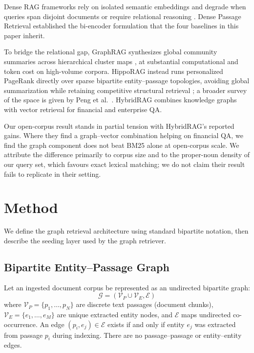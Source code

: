 \documentclass[runningheads]{llncs}
\begin{document}
Dense RAG frameworks rely on isolated semantic embeddings and degrade when queries span disjoint documents or require relational reasoning \cite{lewis2020rag}. Dense Passage Retrieval \cite{karpukhin2020dpr} established the bi-encoder formulation that the four baselines in this paper inherit.

To bridge the relational gap, GraphRAG synthesizes global community summaries across hierarchical cluster maps \cite{edge2024graphrag}, at substantial computational and token cost on high-volume corpora. HippoRAG instead runs personalized PageRank directly over sparse bipartite entity--passage topologies, avoiding global summarization while retaining competitive structural retrieval \cite{gutierrez2025hipporag2}; a broader survey of the space is given by Peng et al.~\cite{peng2024graphrag}. HybridRAG \cite{sarmah2024hybridrag} combines knowledge graphs with vector retrieval for financial and enterprise QA.

Our open-corpus result stands in partial tension with HybridRAG's reported gains. Where they find a graph--vector combination helping on financial QA, we find the graph component does not beat BM25 alone at open-corpus scale. We attribute the difference primarily to corpus size and to the proper-noun density of our query set, which favours exact lexical matching; we do not claim their result fails to replicate in their setting.

\section{Method}

We define the graph retrieval architecture using standard bipartite notation, then describe the seeding layer used by the graph retriever.

\subsection{Bipartite Entity--Passage Graph}

Let an ingested document corpus be represented as an undirected bipartite graph:
\begin{equation}
\mathcal{G} = (\mathcal{V}_P \cup \mathcal{V}_E, \mathcal{E})
\end{equation}
where $\mathcal{V}_P = \{p_1, \dots, p_N\}$ are discrete text passages (document chunks), $\mathcal{V}_E = \{e_1, \dots, e_M\}$ are unique extracted entity nodes, and $\mathcal{E}$ maps undirected co-occurrence. An edge $(p_i, e_j) \in \mathcal{E}$ exists if and only if entity $e_j$ was extracted from passage $p_i$ during indexing. There are no passage--passage or entity--entity edges.
\end{document}
